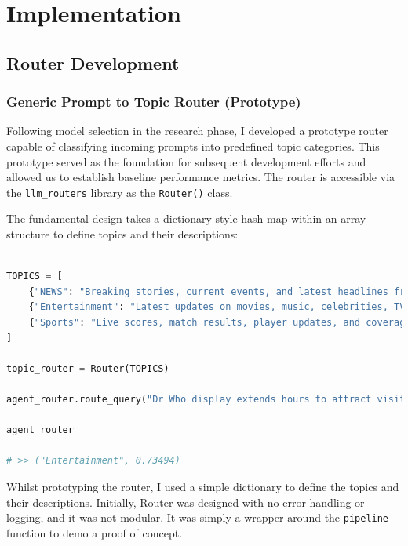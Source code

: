 \chapter{Implementation}
\label{ch:implementation}

\section{Router Development}

\subsection{Generic Prompt to Topic Router (Prototype)}
\label{sec:generic_router_dev}

Following model selection in the research phase, I developed a prototype router capable of classifying incoming prompts into predefined topic categories. This prototype served as the foundation for subsequent development efforts and allowed us to establish baseline performance metrics. The router is accessible via the \texttt{llm\_routers} library as the \texttt{Router()} class.

The fundamental design takes a dictionary style hash map within an array structure to define topics and their descriptions:

\begin{lstlisting}[language=Python, caption={Example Router Usage}, breaklines=true]

TOPICS = [
    {"NEWS": "Breaking stories, current events, and latest headlines from around the world, updated in real time."},
    {"Entertainment": "Latest updates on movies, music, celebrities, TV shows, and pop culture highlights."},
    {"Sports": "Live scores, match results, player updates, and coverage of major sporting events worldwide."}
]

topic_router = Router(TOPICS)

agent_router.route_query("Dr Who display extends hours to attract visitors")

agent_router

# >> ("Entertainment", 0.73494)
\end{lstlisting}



Whilst prototyping the router, I used a simple dictionary to define the topics and their descriptions. Initially, Router was designed with no error handling or logging, and it was not modular. It was simply a wrapper around the \texttt{pipeline} function to demo a proof of concept. 

